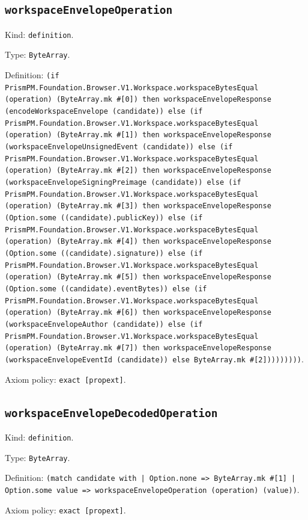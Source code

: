 \documentclass[11pt]{article}
\begin{document}
\subsection*{\texttt{workspaceEnvelopeOperation}}
\noindent Kind: \texttt{definition}.\par
\noindent Type: \texttt{ByteArray}.\par
\noindent Definition: \texttt{(if PrismPM.Foundation.Browser.V1.Workspace.workspaceBytesEqual (operation) (ByteArray.mk \#[0]) then workspaceEnvelopeResponse (encodeWorkspaceEnvelope (candidate)) else (if PrismPM.Foundation.Browser.V1.Workspace.workspaceBytesEqual (operation) (ByteArray.mk \#[1]) then workspaceEnvelopeResponse (workspaceEnvelopeUnsignedEvent (candidate)) else (if PrismPM.Foundation.Browser.V1.Workspace.workspaceBytesEqual (operation) (ByteArray.mk \#[2]) then workspaceEnvelopeResponse (workspaceEnvelopeSigningPreimage (candidate)) else (if PrismPM.Foundation.Browser.V1.Workspace.workspaceBytesEqual (operation) (ByteArray.mk \#[3]) then workspaceEnvelopeResponse (Option.some ((candidate).publicKey)) else (if PrismPM.Foundation.Browser.V1.Workspace.workspaceBytesEqual (operation) (ByteArray.mk \#[4]) then workspaceEnvelopeResponse (Option.some ((candidate).signature)) else (if PrismPM.Foundation.Browser.V1.Workspace.workspaceBytesEqual (operation) (ByteArray.mk \#[5]) then workspaceEnvelopeResponse (Option.some ((candidate).eventBytes)) else (if PrismPM.Foundation.Browser.V1.Workspace.workspaceBytesEqual (operation) (ByteArray.mk \#[6]) then workspaceEnvelopeResponse (workspaceEnvelopeAuthor (candidate)) else (if PrismPM.Foundation.Browser.V1.Workspace.workspaceBytesEqual (operation) (ByteArray.mk \#[7]) then workspaceEnvelopeResponse (workspaceEnvelopeEventId (candidate)) else ByteArray.mk \#[2]))))))))}.\par
\noindent Axiom policy: \texttt{exact [propext]}.\par
\subsection*{\texttt{workspaceEnvelopeDecodedOperation}}
\noindent Kind: \texttt{definition}.\par
\noindent Type: \texttt{ByteArray}.\par
\noindent Definition: \texttt{(match candidate with | Option.none => ByteArray.mk \#[1] | Option.some value => workspaceEnvelopeOperation (operation) (value))}.\par
\noindent Axiom policy: \texttt{exact [propext]}.\par
\end{document}
